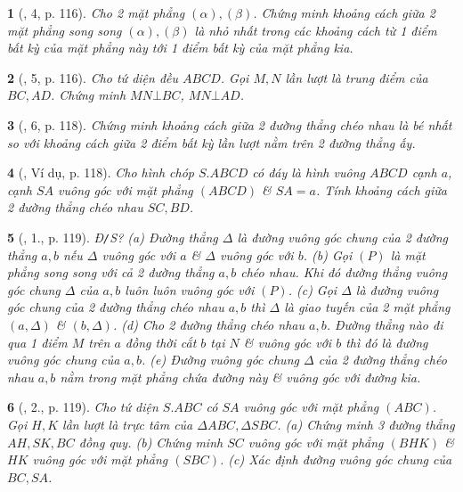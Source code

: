 \documentclass{article}
\newtheorem{baitoan}{}
\begin{document}
\begin{baitoan}[\cite{SGK_Toan_11_hinh_hoc_co_ban}, 4, p. 116]
	Cho 2 mặt phẳng $(\alpha),(\beta)$. Chứng minh khoảng cách giữa 2 mặt phẳng song song $(\alpha),(\beta)$ là nhỏ nhất trong các khoảng cách từ 1 điểm bất kỳ của mặt phẳng này tới 1 điểm bất kỳ của mặt phẳng kia.
\end{baitoan}

\begin{baitoan}[\cite{SGK_Toan_11_hinh_hoc_co_ban}, 5, p. 116]
	Cho tứ diện đều $ABCD$. Gọi $M,N$ lần lượt là trung điểm của $BC,AD$. Chứng minh $MN\bot BC$, $MN\bot AD$.
\end{baitoan}

\begin{baitoan}[\cite{SGK_Toan_11_hinh_hoc_co_ban}, 6, p. 118]
	Chứng minh khoảng cách giữa 2 đường thẳng chéo nhau là bé nhất so với khoảng cách giữa 2 điểm bất kỳ lần lượt nằm trên 2 đường thẳng ấy.
\end{baitoan}

\begin{baitoan}[\cite{SGK_Toan_11_hinh_hoc_co_ban}, Ví dụ, p. 118]
	Cho hình chóp $S.ABCD$ có đáy là hình vuông $ABCD$ cạnh $a$, cạnh $SA$ vuông góc với mặt phẳng $(ABCD)$ \& $SA = a$. Tính khoảng cách giữa 2 đường thẳng chéo nhau $SC,BD$.
\end{baitoan}

\begin{baitoan}[\cite{SGK_Toan_11_hinh_hoc_co_ban}, 1., p. 119]
	\emph{Đ\texttt{/}S?} (a) Đường thẳng $\Delta$ là đường vuông góc chung của 2 đường thẳng $a,b$ nếu $\Delta$ vuông góc với $a$ \& $\Delta$ vuông góc với $b$. (b) Gọi $(P)$ là mặt phẳng song song với cả 2 đường thẳng $a,b$ chéo nhau. Khi đó đường thẳng vuông góc chung $\Delta$ của $a,b$ luôn luôn vuông góc với $(P)$. (c) Gọi $\Delta$ là đường vuông góc chung của 2 đường thẳng chéo nhau $a,b$ thì $\Delta$ là giao tuyến của 2 mặt phẳng $(a,\Delta)$ \& $(b,\Delta)$. (d) Cho 2 đường thẳng chéo nhau $a,b$. Đường thẳng nào đi qua 1 điểm $M$ trên $a$ đồng thời cắt $b$ tại $N$ \& vuông góc với $b$ thì đó là đường vuông góc chung của $a,b$. (e) Đường vuông góc chung $\Delta$ của 2 đường thẳng chéo nhau $a,b$ nằm trong mặt phẳng chứa đường này \& vuông góc với đường kia.
\end{baitoan}

\begin{baitoan}[\cite{SGK_Toan_11_hinh_hoc_co_ban}, 2., p. 119]
	Cho tứ diện $S.ABC$ có $SA$ vuông góc với mặt phẳng $(ABC)$. Gọi $H,K$ lần lượt là trực tâm của $\Delta ABC,\Delta SBC$. (a) Chứng minh 3 đường thẳng $AH,SK,BC$ đồng quy. (b) Chứng minh $SC$ vuông góc với mặt phẳng $(BHK)$ \& $HK$ vuông góc với mặt phẳng $(SBC)$. (c) Xác định đường vuông góc chung của $BC,SA$.
\end{baitoan}
\end{document}

